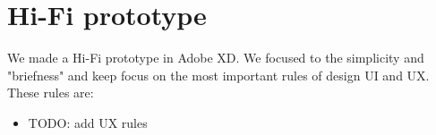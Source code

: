 \section{Hi-Fi prototype}\label{sec:hi-fi-prototype}
We made a Hi-Fi prototype in Adobe XD.
We focused to the simplicity and "briefness" and keep focus on the most important rules of design UI and UX.
These rules are:
\begin{itemize}
    \item TODO: add UX rules
\end{itemize}
















